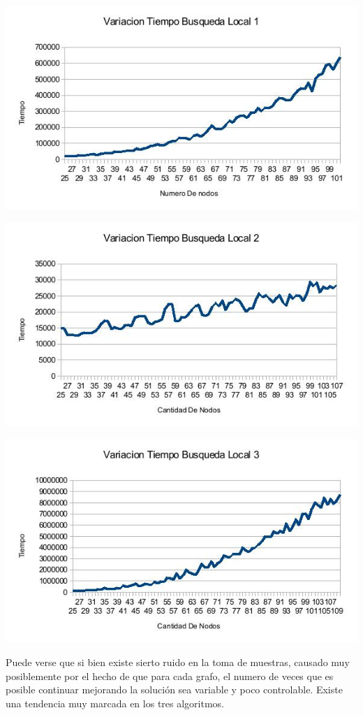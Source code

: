 \includegraphics[scale=0.5]{Ej4/tiempo1.jpg}

\includegraphics[scale=0.5]{Ej4/tiempo2.jpg}

\includegraphics[scale=0.5]{Ej4/tiempo3.jpg}

Puede verse que si bien existe sierto ruido en la toma de muestras, causado muy posiblemente por el hecho de que para cada grafo, el numero de veces que es posible continuar mejorando la solución sea variable y poco controlable. Existe una tendencia muy marcada en los tres algoritmos.

